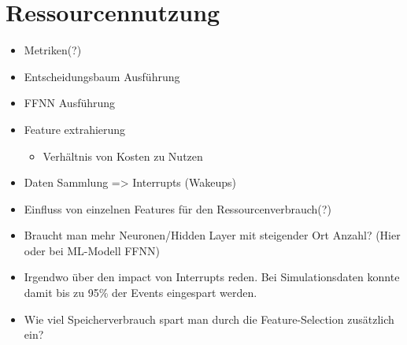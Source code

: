 \section{Ressourcennutzung}
\begin{itemize}
    \item Metriken(?)
    \item Entscheidungsbaum Ausführung
    \item FFNN Ausführung
    \item Feature extrahierung
    \begin{itemize}
        \item Verhältnis von Kosten zu Nutzen
    \end{itemize}
    \item Daten Sammlung => Interrupts (Wakeups)
    \item Einfluss von einzelnen Features für den Ressourcenverbrauch(?)
    \item Braucht man mehr Neuronen/Hidden Layer mit steigender Ort Anzahl? (Hier oder bei ML-Modell FFNN)
    \item Irgendwo über den impact von Interrupts reden. Bei Simulationsdaten konnte damit bis zu 95\% der Events eingespart werden.
    \item Wie viel Speicherverbrauch spart man durch die Feature-Selection zusätzlich ein?
\end{itemize}